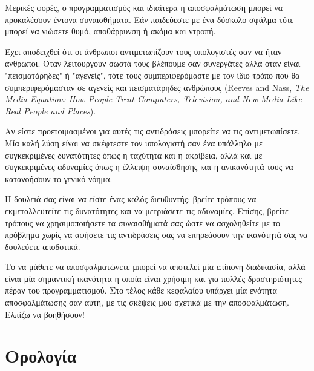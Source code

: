 \documentclass[10pt]{book}
\begin{document}
Μερικές φορές, ο προγραμματισμός και ιδιαίτερα η αποσφαλμάτωση  μπορεί να προκαλέσουν έντονα συναισθήματα. Εάν παιδεύεστε με ένα δύσκολο σφάλμα τότε μπορεί να νιώσετε θυμό, αποθάρρυνση ή ακόμα και ντροπή.

Έχει αποδειχθεί ότι οι άνθρωποι αντιμετωπίζουν τους υπολογιστές
σαν να ήταν άνθρωποι. Όταν λειτουργούν σωστά τους βλέπουμε σαν συνεργάτες αλλά 
όταν είναι "πεισματάρηδες" ή "αγενείς", τότε τους συμπεριφερόμαστε με τον
ίδιο τρόπο που θα συμπεριφερόμασταν σε αγενείς και πεισματάρηδες ανθρώπους
(Reeves and Nass, {\it The Media Equation: How People Treat Computers, Television, and New Media Like Real People and Places}).

Αν είστε προετοιμασμένοι για αυτές τις αντιδράσεις μπορείτε να
τις αντιμετωπίσετε. Μία καλή λύση είναι να σκέφτεστε
τον υπολογιστή σαν ένα υπάλληλο με συγκεκριμένες δυνατότητες όπως
η ταχύτητα και η ακρίβεια, αλλά και με συγκεκριμένες αδυναμίες όπως η
έλλειψη συναίσθησης και η ανικανότητά τους να κατανοήσουν το γενικό νόημα.

Η δουλειά σας είναι να είστε ένας καλός διευθυντής: βρείτε τρόπους
να εκμεταλλευτείτε τις δυνατότητες και να μετριάσετε τις αδυναμίες.  
Επίσης, βρείτε τρόπους να χρησιμοποιήσετε τα συναισθήματά σας ώστε
να ασχοληθείτε με το πρόβλημα χωρίς να αφήσετε τις αντιδράσεις σας
να επηρεάσουν την ικανότητά σας να δουλεύετε αποδοτικά.

Το να μάθετε να αποσφαλματώνετε μπορεί να αποτελεί μία επίπονη διαδικασία,
αλλά είναι μία σημαντική ικανότητα η οποία είναι χρήσιμη και για
πολλές δραστηριότητες πέραν του προγραμματισμού.  Στο τέλος κάθε
κεφαλαίου υπάρχει μία ενότητα αποσφαλμάτωσης σαν αυτή, με τις
σκέψεις μου σχετικά με την αποσφαλμάτωση. Ελπίζω να βοηθήσουν!


\section{Ορολογία}
\end{document}
